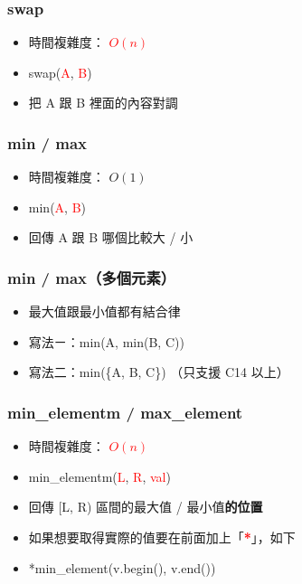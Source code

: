 \documentclass[mathserif]{beamer}
\begin{document}
\begin{frame}
    \frametitle{swap}
    \begin{itemize}
        \item 時間複雜度： \textcolor{red}{\textbf{$O(n)$}}
        \item swap(\textcolor{red}{A}, \textcolor{red}{B})
        \item 把 A 跟 B 裡面的內容對調
    \end{itemize}
\end{frame}

\begin{frame}
    \frametitle{min / max}
    \begin{itemize}
        \item 時間複雜度： $O(1)$
        \item min(\textcolor{red}{A}, \textcolor{red}{B})
        \item 回傳 A 跟 B 哪個比較大 / 小
    \end{itemize}
\end{frame}

\begin{frame}
    \frametitle{min / max（多個元素）}
    \begin{itemize}
        \item 最大值跟最小值都有結合律
        \item 寫法ㄧ：min(A, min(B, C))
        \item 寫法二：min(\{A, B, C\}) （只支援 C14 以上）
    \end{itemize}
\end{frame}

\begin{frame}
    \frametitle{min\_elementm / max\_element}
    \begin{itemize}
        \item 時間複雜度： \textcolor{red}{\textbf{$O(n)$}}
        \item min\_elementm(\textcolor{red}{L}, \textcolor{red}{R}, \textcolor{red}{val})
        \item 回傳 [L, R) 區間的最大值 / 最小值\textbf{的位置}
        \vspace{0.5cm}
        \item 如果想要取得實際的值要在前面加上「\textcolor{red}{\textbf{*}}」，如下
        \item *min\_element(v.begin(), v.end())
    \end{itemize}
\end{frame}
\end{document}
